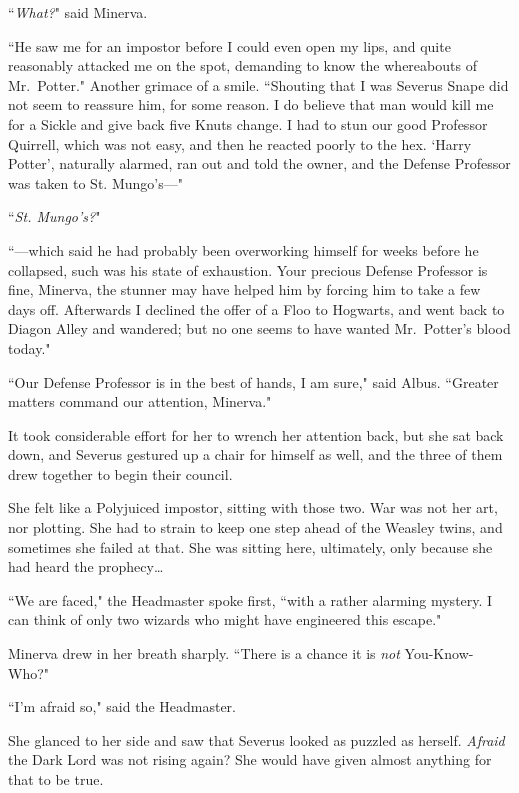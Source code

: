 ``\emph{What?}" said Minerva.

``He saw me for an impostor before I could even open my lips, and quite reasonably attacked me on the spot, demanding to know the whereabouts of Mr.~Potter." Another grimace of a smile. ``Shouting that I was Severus Snape did not seem to reassure him, for some reason. I do believe that man would kill me for a Sickle and give back five Knuts change. I had to stun our good Professor Quirrell, which was not easy, and then he reacted poorly to the hex. `Harry Potter', naturally alarmed, ran out and told the owner, and the Defense Professor was taken to St. Mungo's---"

``\emph{St. Mungo's?}"

``---which said he had probably been overworking himself for weeks before he collapsed, such was his state of exhaustion. Your precious Defense Professor is fine, Minerva, the stunner may have helped him by forcing him to take a few days off. Afterwards I declined the offer of a Floo to Hogwarts, and went back to Diagon Alley and wandered; but no one seems to have wanted Mr.~Potter's blood today."

``Our Defense Professor is in the best of hands, I am sure," said Albus. ``Greater matters command our attention, Minerva."

It took considerable effort for her to wrench her attention back, but she sat back down, and Severus gestured up a chair for himself as well, and the three of them drew together to begin their council.

She felt like a Polyjuiced impostor, sitting with those two. War was not her art, nor plotting. She had to strain to keep one step ahead of the Weasley twins, and sometimes she failed at that. She was sitting here, ultimately, only because she had heard the prophecy{\ldots}

``We are faced," the Headmaster spoke first, ``with a rather alarming mystery. I can think of only two wizards who might have engineered this escape."

Minerva drew in her breath sharply. ``There is a chance it is \emph{not} You-Know-Who?"

``I'm afraid so," said the Headmaster.

She glanced to her side and saw that Severus looked as puzzled as herself. \emph{Afraid} the Dark Lord was not rising again? She would have given almost anything for that to be true.

